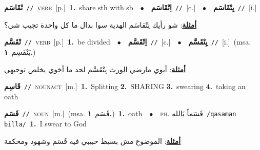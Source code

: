 \documentclass[10pt,a4paper,twoside]{article} %
\begin{document}
\begin{multicols}{2}
{\setlength\topsep{0pt}\textbf{\foreignlanguage{arabic}{تْقَاسَم}}\ {\color{gray}\texttt{//}\color{black}}\ \textsc{verb}\ [p.]\ \textbf{1.}~share sth with sb\ \ $\bullet$\ \ \setlength\topsep{0pt}\textbf{\foreignlanguage{arabic}{اِتْقَاسَم}}\ {\color{gray}\texttt{//}\color{black}}\ [c.]\ \ $\bullet$\ \ \setlength\topsep{0pt}\textbf{\foreignlanguage{arabic}{يِتْقَاسَم}}\ {\color{gray}\texttt{//}\color{black}}\ [i.]\  \begin{flushright}\color{gray}\foreignlanguage{arabic}{\textbf{\underline{\foreignlanguage{arabic}{أمثلة}}}: شو رأيك نِتْقاسَم الهدية سوا بدال ما كل واحدة تجيب شي؟}\end{flushright}\color{black}} \vspace{2mm}

{\setlength\topsep{0pt}\textbf{\foreignlanguage{arabic}{تْقَسَّم}}\ {\color{gray}\texttt{//}\color{black}}\ \textsc{verb}\ [p.]\ \textbf{1.}~be divided\ \ $\bullet$\ \ \setlength\topsep{0pt}\textbf{\foreignlanguage{arabic}{اِتْقَسَّم}}\ {\color{gray}\texttt{//}\color{black}}\ [c.]\ \ $\bullet$\ \ \setlength\topsep{0pt}\textbf{\foreignlanguage{arabic}{يِتْقَسَّم}}\ {\color{gray}\texttt{//}\color{black}}\ [i.]\ \color{gray}(msa. \foreignlanguage{arabic}{يَنْقَسِم}~\foreignlanguage{arabic}{\textbf{١.}})\color{black}\  \begin{flushright}\color{gray}\foreignlanguage{arabic}{\textbf{\underline{\foreignlanguage{arabic}{أمثلة}}}: أبوي مارضي الورث يِتْقَسَّم لحد ما أخوي يخلص توجيهي}\end{flushright}\color{black}} \vspace{2mm}

{\setlength\topsep{0pt}\textbf{\foreignlanguage{arabic}{قَاسِم}}\ {\color{gray}\texttt{//}\color{black}}\ \textsc{noun\textunderscore act}\ [m.]\ \textbf{1.}~Splitting  \textbf{2.}~SHARING  \textbf{3.}~swearing  \textbf{4.}~taking an oath\ } \vspace{2mm}

{\setlength\topsep{0pt}\textbf{\foreignlanguage{arabic}{قَسَم}}\ {\color{gray}\texttt{//}\color{black}}\ \textsc{noun}\ [m.]\ \color{gray}(msa. \foreignlanguage{arabic}{قَسَم}~\foreignlanguage{arabic}{\textbf{١.}})\color{black}\ \textbf{1.}~oath\ \ $\bullet$\ \ \textsc{ph.} \color{gray} \foreignlanguage{arabic}{قَسَماً بَالله}\color{black}\ {\color{gray}\texttt{/{\sffamily qasaman billa}/}\color{black}}\ \textbf{1.}~I swear to God\  \begin{flushright}\color{gray}\foreignlanguage{arabic}{\textbf{\underline{\foreignlanguage{arabic}{أمثلة}}}: الموضوع مش بسيط حبيبي فيه قَسَم وشهود ومحكمة}\end{flushright}\color{black}} \vspace{2mm}


\end{multicols}
\end{document}
